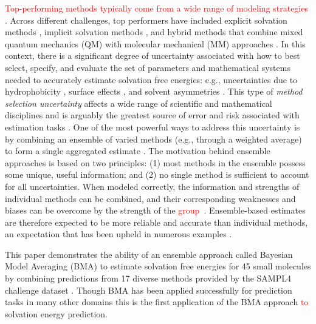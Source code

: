 \documentclass[journal=jpcbfk, manuscript=article]{achemso}
\newcommand{\+}[1]{\ensuremath{\mathbf{#1}}}
\newcommand{\rev}[1]{\textsf{\textcolor{red}{#1}}}
\begin{document}
\rev{Top-performing methods typically come from a wide range of modeling strategies \cite{Nicholls:2008, Mobley:2009b, Mobley:2009, Mobley:2014}}.
Across different challenges, top performers have included explicit solvation methods \cite{Klimovich:2010, Levy:1998, Mobley:2009c}, implicit solvation methods \cite{Mennucci:2007,Jorgensen:2004}, and hybrid methods that combine mixed quantum mechanics (QM) with molecular mechanical (MM) approaches \cite{Konig:2014, Kamerlin:2009}.
In this context, there is a significant degree of uncertainty associated with how to best select, specify, and evaluate the set of parameters and mathematical systems needed to accurately estimate solvation free energies: e.g., uncertainties due to hydrophobicity \cite{Ashbaugh:1999}, surface effects \cite{Chorny:05}, and solvent asymmetries \cite{Mobley:08}.  This type of \emph{method selection uncertainty} affects a wide range of scientific and mathematical disciplines and is arguably the greatest source of error and risk associated with estimation tasks \cite{Rojas:2010, Apostolakis:1990, Devooght:1998, Neuman:2003}.
One of the most powerful ways to address this uncertainty is by combining an ensemble of varied methods (e.g., through a weighted average) to form a single aggregated estimate \cite{Bates:1969, Opitz:1999, Rokach:2010, Hoeting:1999}.
The motivation behind ensemble approaches is based on two principles: (1) most methods in the ensemble possess some unique, useful information; and (2) no single method is sufficient to account for all uncertainties.
When modeled correctly, the information and strengths of individual methods can be combined, and their corresponding weaknesses and biases can be overcome by the strength of the \rev{group}~\cite{Seni:2010, Hoeting:1999,Raftery:1998,Raftery:1995}. 
Ensemble-based estimates are therefore expected to be more reliable and accurate than individual methods, an expectation that has been upheld in numerous examples \cite{Gosink:2014, Zhang:2003, Bates:1969, Morales-Casique:2010, Opitz:1999, Rokach:2010, Hoeting:1999, Seni:2010, Raftery:2005, Vlachopoulo:2013, Seni:2010, Hoeting:1999, Raftery:1998, Raftery:1995}.

This paper demonstrates the ability of an ensemble approach called Bayesian Model Averaging (BMA) \cite{Hoeting:1999} to estimate solvation free energies for 45 small molecules by combining predictions from 17 diverse methods provided by the SAMPL4 challenge dataset \cite{Mobley:2014}.
Though BMA has been applied successfully for prediction tasks in many other domains \cite{Ye:2004, Vlachopoulo:2013, Raftery:2005, Morales-Casique:2010, Gosink:2014} this is the first application of the BMA approach \rev{to} solvation energy prediction.
\end{document}
